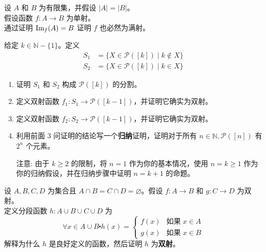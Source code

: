 \begin{exercise}
    设 $A$ 和 $B$ 为有限集，并假设 $|A| = |B|$。\\
    假设函数 $f : A \to B$ 为单射。\\
    通过证明 $\text{Im}_f (A) = B$ 证明 $f$ 也必然为满射。
\end{exercise}

\begin{exercise}
    给定 $k \in \mathbb{N} - \{1\}$。定义
    \begin{align*}
        S_1 & = \{X \in \mathcal{P}([k]) \mid k \notin X\} \\
        S_2 & = \{X \in \mathcal{P}([k]) \mid k \in X\}
    \end{align*}
    \begin{enumerate}[label=(\alph*)]
        \item 证明 $S_1$ 和 $S_2$ 构成 $\mathcal{P}([k])$ 的分割。
        \item 定义双射函数 $f_1 : S_1 \to \mathcal{P}([k-1])$，并证明它确实为双射。
        \item 定义双射函数 $f_2 : S_2 \to \mathcal{P}([k-1])$，并证明它确实为双射。
        \item 利用前面 3 问证明的结论写一个\textbf{归纳}证明，证明对于所有 $n \in \mathbb{N}, \mathcal{P}([n])$ 有 $2^n$ 个元素。

              注意: 由于 $k \ge 2$ 的限制，将 $n = 1$ 作为你的基本情况，使用 $n = k \ge 1$ 作为你的归纳假设，并在归纳步骤中证明 $n = k + 1$ 的命题。
    \end{enumerate}\label{exc:exercises7.8.30}
\end{exercise}

\begin{exercise}
    设 $A, B, C, D$ 为集合且 $A \cap B = C \cap D = \varnothing$。假设 $f : A \to B$ 和 $g : C \to D$ 为双射。\\
    定义分段函数 $h : A \cup B \cup C \cup D$ 为
    \[\forall x \in A \cup B \centerdot h(x) = \begin{cases}
            f(x) & \text{如果}\; x \in A \\
            g(x) & \text{如果}\; x \in B
        \end{cases}\]
    解释为什么 $h$ 是良好定义的函数，然后证明 $h$ 为\textbf{双射}。\label{exc:exercises7.8.31}
\end{exercise}

